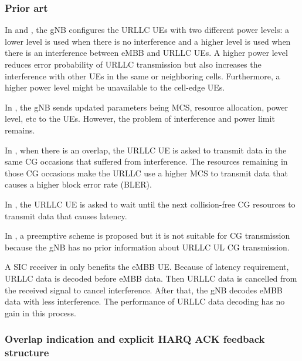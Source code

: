 \documentclass{ieeeaccess}
\begin{document}
\subsubsection{Prior art} \label{IIBN}

In \cite{ref13} and \cite {ref14}, the gNB configures the URLLC UEs with two different power levels: a lower level is used when there is no interference and a higher level is used when there is an interference between eMBB and URLLC UEs. A higher power level reduces error probability of URLLC transmission but also increases the interference with other UEs in the same or neighboring cells. Furthermore, a higher power level might be unavailable to the cell-edge UEs.

In \cite{ref15}, the gNB sends updated parameters being MCS, resource allocation, power level, etc to the UEs. However, the problem of interference and power limit remains.

In \cite{ref16}, when there is an overlap, the URLLC UE is asked to transmit data in the same CG occasions that suffered from interference. The resources remaining in those CG occasions make the URLLC use a higher MCS to transmit data that causes a higher block error rate (BLER).

In \cite{ref17}, the URLLC UE is asked to wait until the next collision-free CG resources to transmit data that causes latency.

In \cite{ref18}, a preemptive scheme is proposed but it is not suitable for CG transmission because the gNB has no prior information about URLLC UL CG transmission.

A SIC receiver in \cite{ref19} only benefits the eMBB UE. Because of latency requirement, URLLC data is decoded before eMBB data. Then URLLC data is cancelled from the received signal to cancel interference. After that, the gNB decodes eMBB data with less interference. The performance of URLLC data decoding has no gain in this process.

\subsubsection{Overlap indication and explicit HARQ ACK feedback structure}\label{IIB2}
\end{document}
